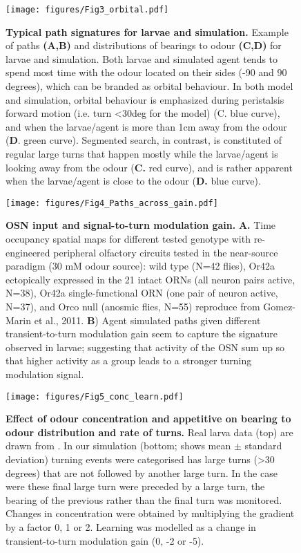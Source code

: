 \documentclass[10pt,a4paper]{article}
\begin{document}
\begin{figure}[!ht]
\begin{center}
\texttt{[image: figures/Fig3\_orbital.pdf]}
\caption{{\bf Typical path signatures for larvae and simulation.} Example of paths {\bf (A,B)} and distributions of bearings to odour {\bf (C,D)} for larvae and simulation. Both larvae and simulated agent tends to spend most time with the odour located on their sides (-90 and 90 degrees), which can be branded as orbital behaviour. In both model and simulation, orbital behaviour is emphasized during peristalsis forward motion (i.e. turn <30deg for the model) (C. blue curve), and when the larvae/agent is more than 1cm away from the odour ({\bf D}. green curve). Segmented search, in contrast, is constituted of regular large turns that happen mostly while the larvae/agent is looking away from the odour ({\bf C.} red curve), and is rather apparent when the larvae/agent is close to the odour ({\bf D.} blue curve).
\label{fig:Fig3}}
\end{center}
\end{figure}


\begin{figure}[!ht]
\begin{center}
\texttt{[image: figures/Fig4\_Paths\_across\_gain.pdf]}
\caption{{\bf OSN input and signal-to-turn modulation gain.}
{\bf A.} Time occupancy spatial maps for different tested genotype with re-engineered peripheral olfactory circuits tested in the near-source paradigm (30 mM odour source): wild type (N=42 flies), Or42a ectopically expressed in the 21 intact ORNs (all neuron pairs active, N=38), Or42a single-functional ORN (one pair of neuron active, N=37), and Orco null (anosmic flies, N=55) reproduce from Gomez-Marin et al., 2011.
{\bf B}) Agent simulated paths given different transient-to-turn modulation gain seem to capture the signature observed in larvae; suggesting that activity of the OSN sum up so that higher activity as a group leads to a stronger turning modulation signal.
\label{fig:Fig4}}
\end{center}
\end{figure}


\begin{figure}[!ht]
\begin{center}
\texttt{[image: figures/Fig5\_conc\_learn.pdf]}
\caption{{\bf Effect of odour concentration and appetitive on bearing to odour distribution and rate of turns.} Real larva data (top) are drawn from \citep{schleyer2015learning}. In our simulation (bottom; shows mean $\pm$ standard deviation) turning events were categorised has large turns (>30 degrees) that are not followed by another large turn. In the case were these final large turn were preceded by a large turn, the bearing of the previous rather than the final turn was monitored. Changes in concentration were obtained by multiplying the gradient by a factor 0, 1 or 2. Learning was modelled as a change in transient-to-turn modulation gain (0, -2 or -5). 
\label{fig:Fig5}}
\end{center}
\end{figure}
\end{document}
